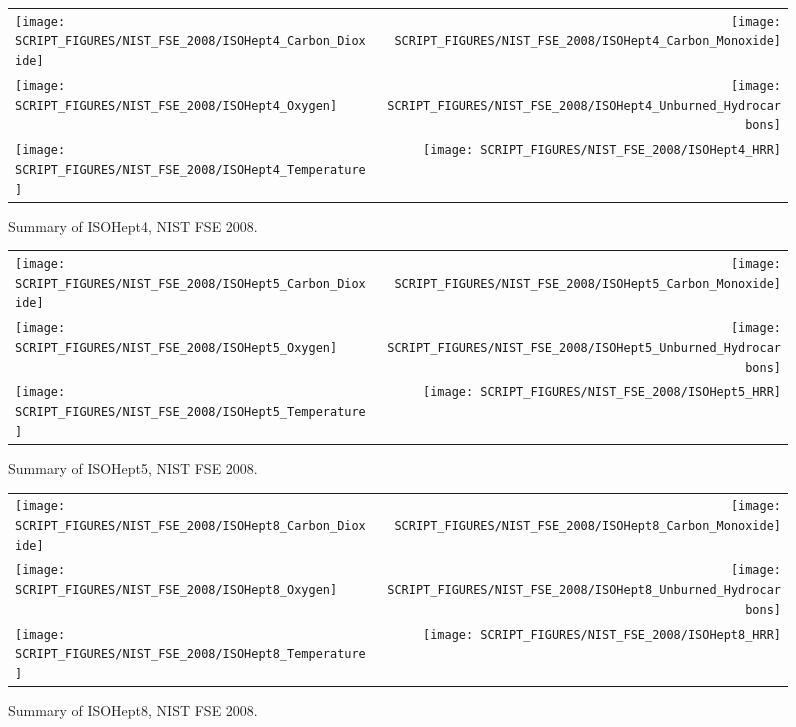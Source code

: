 \begin{figure}[h]
\begin{tabular*}{\textwidth}{l@{\extracolsep{\fill}}r}
\texttt{[image: SCRIPT\_FIGURES/NIST\_FSE\_2008/ISOHept4\_Carbon\_Dioxide]} &
\texttt{[image: SCRIPT\_FIGURES/NIST\_FSE\_2008/ISOHept4\_Carbon\_Monoxide]} \\
\texttt{[image: SCRIPT\_FIGURES/NIST\_FSE\_2008/ISOHept4\_Oxygen]} &
\texttt{[image: SCRIPT\_FIGURES/NIST\_FSE\_2008/ISOHept4\_Unburned\_Hydrocarbons]} \\
\texttt{[image: SCRIPT\_FIGURES/NIST\_FSE\_2008/ISOHept4\_Temperature]} & 
\texttt{[image: SCRIPT\_FIGURES/NIST\_FSE\_2008/ISOHept4\_HRR]}
\end{tabular*}
\caption[Summary of ISOHept4, NIST FSE 2008]{Summary of ISOHept4, NIST FSE 2008.}
\label{NIST_FSE_1994_ISOHept4}
\end{figure}

\begin{figure}[h]
\begin{tabular*}{\textwidth}{l@{\extracolsep{\fill}}r}
\texttt{[image: SCRIPT\_FIGURES/NIST\_FSE\_2008/ISOHept5\_Carbon\_Dioxide]} &
\texttt{[image: SCRIPT\_FIGURES/NIST\_FSE\_2008/ISOHept5\_Carbon\_Monoxide]} \\
\texttt{[image: SCRIPT\_FIGURES/NIST\_FSE\_2008/ISOHept5\_Oxygen]} &
\texttt{[image: SCRIPT\_FIGURES/NIST\_FSE\_2008/ISOHept5\_Unburned\_Hydrocarbons]} \\
\texttt{[image: SCRIPT\_FIGURES/NIST\_FSE\_2008/ISOHept5\_Temperature]} &
\texttt{[image: SCRIPT\_FIGURES/NIST\_FSE\_2008/ISOHept5\_HRR]}
\end{tabular*}
\caption[Summary of ISOHept5, NIST FSE 2008]{Summary of ISOHept5, NIST FSE 2008.}
\label{NIST_FSE_1994_ISOHept5}
\end{figure}

\begin{figure}[h]
\begin{tabular*}{\textwidth}{l@{\extracolsep{\fill}}r}
\texttt{[image: SCRIPT\_FIGURES/NIST\_FSE\_2008/ISOHept8\_Carbon\_Dioxide]} &
\texttt{[image: SCRIPT\_FIGURES/NIST\_FSE\_2008/ISOHept8\_Carbon\_Monoxide]} \\
\texttt{[image: SCRIPT\_FIGURES/NIST\_FSE\_2008/ISOHept8\_Oxygen]} &
\texttt{[image: SCRIPT\_FIGURES/NIST\_FSE\_2008/ISOHept8\_Unburned\_Hydrocarbons]} \\
\texttt{[image: SCRIPT\_FIGURES/NIST\_FSE\_2008/ISOHept8\_Temperature]} &
\texttt{[image: SCRIPT\_FIGURES/NIST\_FSE\_2008/ISOHept8\_HRR]}
\end{tabular*}
\caption[Summary of ISOHept8, NIST FSE 2008]{Summary of ISOHept8, NIST FSE 2008.}
\label{NIST_FSE_1994_ISOHept8}
\end{figure}

